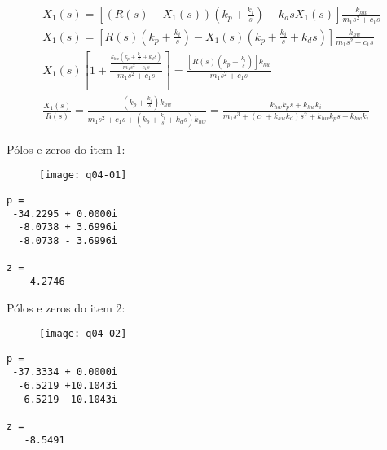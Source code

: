 \documentclass[a4paper,11pt]{article}
\begin{document}
\begin{gather*}
    X_1\left(s\right) = \left[\left(R\left(s\right) - X_1\left(s\right)\right)
        \left(k_p + \frac{k_i}{s}\right) - k_d s X_1\left(s\right)\right]
        \frac{k_{hw}}{m_1 s^2 + c_1 s} \\
    X_1\left(s\right) = \left[R\left(s\right)
        \left(k_p + \frac{k_i}{s}\right) - X_1\left(s\right)
        \left(k_p + \frac{k_i}{s} + k_d s\right)\right]
        \frac{k_{hw}}{m_1 s^2 + c_1 s} \\
    X_1\left(s\right) \left[1 +
        \frac{\frac{k_{hw} \left(k_p + \frac{k_i}{s} + k_d s\right)}
        {m_1 s^2 + c_1 s}}{m_1 s^2 + c_1 s}\right] = \frac{\left[R\left(s\right)
        \left(k_p + \frac{k_i}{s}\right)\right] k_{hw}}{m_1 s^2 + c_1 s} \\
    \frac{X_1\left(s\right)}{R\left(s\right)} = 
        \frac{\left(k_p + \frac{k_i}{s}\right) k_{hw}}
        {m_1 s^2 + c_1 s + \left(k_p + \frac{k_i}{s} + k_d s\right) k_{hw}} =
        \frac{k_{hw} k_p s + k_{hw} k_i}
        {m_1 s^3 + \left(c_1 + k_{hw} k_d\right) s^2 + k_{hw} k_p s +
        k_{hw} k_i}
\end{gather*}

\pagebreak

Pólos e zeros do item 1:

\begin{figure}[H]
\texttt{[image: q04-01]}
\centering
\end{figure}

\begin{lstlisting}
p =
 -34.2295 + 0.0000i
  -8.0738 + 3.6996i
  -8.0738 - 3.6996i

z =
   -4.2746
\end{lstlisting}

\pagebreak

Pólos e zeros do item 2:

\begin{figure}[H]
\texttt{[image: q04-02]}
\centering
\end{figure}

\begin{lstlisting}
p =
 -37.3334 + 0.0000i
  -6.5219 +10.1043i
  -6.5219 -10.1043i

z =
   -8.5491
\end{lstlisting}
\end{document}
